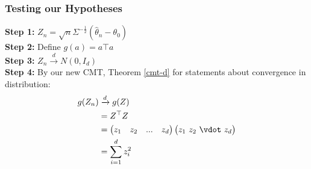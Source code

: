 \documentclass{article}
\newtheorem{corollary}{Corollary}[theorem]
\begin{document}
    \subsubsection*{Testing our Hypotheses}

    \textbf{Step 1:}
    $Z_n = \sqrt{n}\Sigma^{-\frac{1}{2}} ( \hat{\theta}_n - \theta_0)$
    \\
    \textbf{Step 2:}
    Define $g(a) = a\top a$
    \\
    \textbf{Step 3:}
    $Z_n \xrightarrow{d} N(0, I_d)$
    \\
    \textbf{Step 4:}
    By our new CMT, Theorem \ref{cmt-d} for statements about convergence in distribution:
    \begin{align*}
        g(Z_n) &\xrightarrow{d} g(Z) \\ 
        &= Z^\top Z \\
        &= \begin{pmatrix}
            z_1 & z_2 & ... & z_d
        \end{pmatrix} \begin{pmatrix}
            z_1 \
            z_2 \
            \vdot\
            z_d
        \end{pmatrix} \\
        &= \sum^d_{i=1} z_i^2
    \end{align*}
    
    
    
    
    
    
    
    
\end{document}
